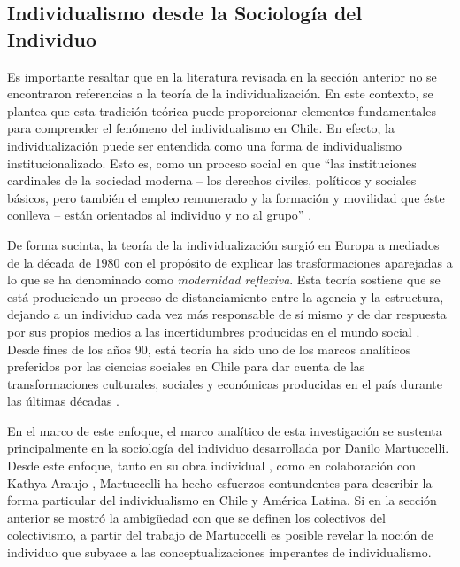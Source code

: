 \documentclass[12pt,twoside]{templates/facsothesis}
\begin{document}
\hypertarget{individualismo-desde-la-sociologuxeda-del-individuo}{%
\subsection{Individualismo desde la Sociología del Individuo}\label{individualismo-desde-la-sociologuxeda-del-individuo}}

Es importante resaltar que en la literatura revisada en la sección anterior no se encontraron referencias a la teoría de la individualización. En este contexto, se plantea que esta tradición teórica puede proporcionar elementos fundamentales para comprender el fenómeno del individualismo en Chile. En efecto, la individualización puede ser entendida como una forma de individualismo institucionalizado. Esto es, como un proceso social en que ``las instituciones cardinales de la sociedad moderna -- los derechos civiles, políticos y sociales básicos, pero también el empleo remunerado y la formación y movilidad que éste conlleva -- están orientados al individuo y no al grupo'' \citep[p.~32]{beck2003}.

De forma sucinta, la teoría de la individualización surgió en Europa a mediados de la década de 1980 con el propósito de explicar las trasformaciones aparejadas a lo que se ha denominado como \emph{modernidad reflexiva}. Esta teoría sostiene que se está produciendo un proceso de distanciamiento entre la agencia y la estructura, dejando a un individuo cada vez más responsable de sí mismo y de dar respuesta por sus propios medios a las incertidumbres producidas en el mundo social \citep{beck2003}. Desde fines de los años 90, está teoría ha sido uno de los marcos analíticos preferidos por las ciencias sociales en Chile para dar cuenta de las transformaciones culturales, sociales y económicas producidas en el país durante las últimas décadas \citep{yopo2013}.

En el marco de este enfoque, el marco analítico de esta investigación se sustenta principalmente en la sociología del individuo desarrollada por Danilo Martuccelli. Desde este enfoque, tanto en su obra individual \citep{martuccelli2010, martuccelli2018}, como en colaboración con Kathya Araujo \citep{araujo2014, araujo2020, araujo2012}, Martuccelli ha hecho esfuerzos contundentes para describir la forma particular del individualismo en Chile y América Latina. Si en la sección anterior se mostró la ambigüedad con que se definen los colectivos del colectivismo, a partir del trabajo de Martuccelli es posible revelar la noción de individuo que subyace a las conceptualizaciones imperantes de individualismo.
\end{document}
